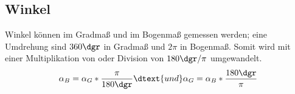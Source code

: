 \documentclass{article}
\begin{document}
\subsection{Winkel}
Winkel können im Gradmaß und im Bogenmaß gemessen werden; eine Umdrehung sind $360\dgr$ in Gradmaß und $2\pi$ in Bogenmaß. Somit wird mit einer Multiplikation von oder Division von $180\dgr / \pi$ umgewandelt.
\[
 \alpha_B = \alpha_G * \frac{\pi}{180\dgr}
 \dtext{und}
 \alpha_G = \alpha_B * \frac{180\dgr}{\pi}
\]
\end{document}
